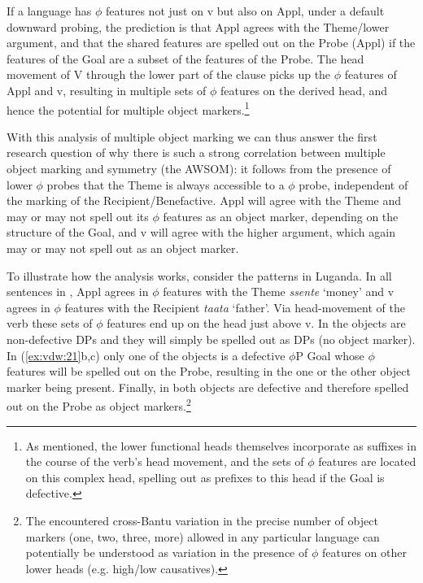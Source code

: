 \documentclass[output=paper
,modfonts
,nonflat]{langsci/langscibook}
\begin{document}
\newpage If a language has $\phi$ features not just on v but also on Appl, under a default downward probing, the prediction is that Appl agrees with the Theme/lower argument, and that the shared features are spelled out on the Probe (Appl) if the features of the Goal are a subset of the features of the Probe. The head movement of V through the lower part of the clause picks up the $\phi$ features of Appl and v, resulting in multiple sets of $\phi$ features on the derived head, and hence the potential for multiple object markers.\footnote{As mentioned, the lower functional heads themselves incorporate as suffixes in the course of the verb’s head movement, and the sets of $\phi$ features are located on this complex head, spelling out as prefixes to this head if the Goal is defective.} 

With this analysis of multiple object marking we can thus answer the first research question of why there is such a strong correlation between multiple object marking and symmetry (the AWSOM): it follows from the presence of lower $\phi$ probes that the Theme is always accessible to a $\phi$ probe, independent of the marking of the Recipient/Benefactive. Appl will agree with the Theme and may or may not spell out its $\phi$ features as an object marker, depending on the structure of the Goal, and v will agree with the higher argument, which again may or may not spell out as an object marker. 

To illustrate how the analysis works, consider the patterns in Luganda. In all sentences in , Appl agrees in $\phi $ features with the Theme \textit{ssente} ‘money’ and v agrees in $\phi$ features with the Recipient \textit{taata} ‘father’. Via head-movement of the verb these sets of $\phi$ features end up on the head just above v. In  the objects are non-defective DPs and they will simply be spelled out as DPs (no object marker). In (\ref{ex:vdw:21}b,c) only one of the objects is a defective $\phi$P Goal whose $\phi$ features will be spelled out on the Probe, resulting in the one or the other object marker being present. Finally, in  both objects are defective and therefore spelled out on the Probe as object markers.\footnote{The encountered cross-Bantu variation in the precise number of object markers (one, two, three, more) allowed in any particular language \citep{Polak1986, Marlo2015} can potentially be understood as variation in the presence of $\phi$ features on other lower heads (e.g. high/low causatives).}
\end{document}
